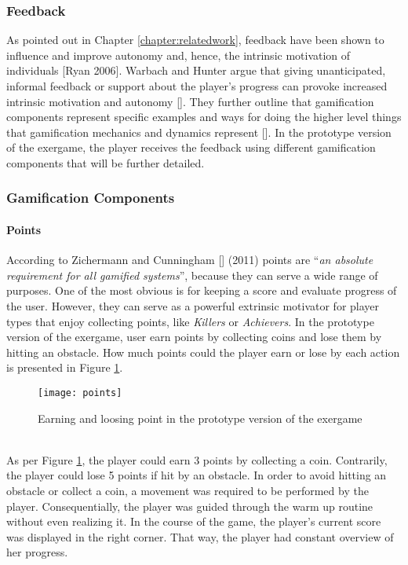 \subsubsection{Feedback}
As pointed out in Chapter \ref{chapter:relatedwork}, feedback have been shown to influence and improve autonomy and, hence, the intrinsic motivation of individuals [Ryan 2006]. Warbach and Hunter argue that giving unanticipated, informal feedback or support about the player's progress can provoke increased intrinsic motivation and autonomy []. They further outline that gamification components represent specific examples and ways for doing the higher level things that gamification mechanics and dynamics represent []. In the prototype version of the exergame, the player receives the feedback using different gamification components that will be further detailed.

\subsubsection{Gamification Components}
\paragraph{Points}
According to Zichermann and Cunningham [] (2011) points are ``\textit{an absolute requirement for all gamified systems}'', because they can serve a wide range of purposes. One of the most obvious is for keeping a score and evaluate progress of the user. However, they can serve as a powerful extrinsic motivator for player types that enjoy collecting points, like \textit{Killers} or \textit{Achievers}. In the prototype version of the exergame, user earn points by collecting coins and lose them by hitting an obstacle. How much points could the player earn or lose by each action is presented in Figure \ref{fig:points}.\\
\begin{figure}[h]
    \centering
    \texttt{[image: points]}
    \caption{Earning and loosing point in the prototype version of the exergame}
    \label{fig:points}
\end{figure}\\
As per Figure \ref{fig:points}, the player could earn 3 points by collecting a coin. Contrarily, the player could lose 5 points if hit by an obstacle. In order to avoid hitting an obstacle or collect a coin, a movement was required to be performed by the player. Consequentially, the player was guided through the warm up routine without even realizing it. In the course of the game, the player's current score was displayed in the right corner. That way, the player had constant overview of her progress.  
